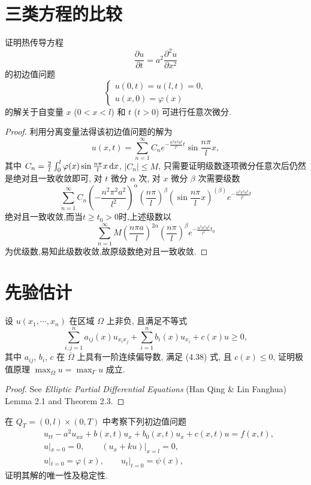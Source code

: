 \section{三类方程的比较}


\begin{exercise}
  证明热传导方程
  \[\frac{\partial u}{\partial t} = a^2 \frac{\partial^2 u}{\partial x^2}\]
  的初边值问题
  \[\begin{cases}
    u(0, t) = u(l, t) = 0, \\
    u(x, 0) = \varphi(x)
  \end{cases}\]
  的解关于自变量 $x$ ($0<x<l$) 和 $t$ ($t>0$) 可进行任意次微分.
\end{exercise}

\begin{proof}
  利用分离变量法得该初边值问题的解为
  \[u(x,t) = \sum_{n=1}^{\infty}C_ne^{-\frac{n^2\pi^2a^2}{l^2}t}\sin\frac{n\pi}{l}x,\]
  其中 $C_n=\frac{2}{l}\int_0^l\varphi(x)\sin\frac{n\pi}{l}x\mathop{}\!\mathrm{d} x$,
  $|C_n|\leq M$, 只需要证明级数逐项微分任意次后仍然是绝对且一致收敛即可,
  对 $t$ 微分 $\alpha$ 次, 对 $x$ 微分 $\beta$ 次需要级数
  \[\sum_{n=1}^{\infty}C_n\left(-\frac{n^2\pi^2a^2}{l^2}\right)^{\alpha}\left(\frac{n\pi}{l}\right)^{\beta}\left(\sin\frac{n\pi}{l}x\right)^{(\beta)}e^{-\frac{n^2\pi^2a^2}{l^2}t}\]
  绝对且一致收敛,而当$t\geq t_0>0$时,上述级数以
  \[\sum_{n=1}^{\infty}M\left(\frac{n\pi a}{l}\right)^{2\alpha}\left(\frac{n\pi}{l}\right)^{\beta}e^{-\frac{n^2\pi^2a^2}{l^2}t_0}\]
  为优级数,易知此级数收敛,故原级数绝对且一致收敛.
\end{proof}


\section{先验估计}

\begin{exercise}
  设 $u(x_1,\cdots,x_n)$ 在区域 $\Omega$ 上非负, 且满足不等式
  \[\sum_{i,j=1}^n a_{ij}(x) u_{x_ix_j} + \sum_{i=1}^n b_i(x) u_{x_i} + c(x)u\geq 0,\]
  其中 $a_{ij}$, $b_i$, $c$ 在 $\overline{\Omega}$ 上具有一阶连续偏导数,
  满足 (4.38) 式, 且 $c(x)\leq 0$,
  证明极值原理 $\max_{\overline{\Omega}}u=\max_{\Gamma}u$ 成立.
\end{exercise}

\begin{proof}
  See \emph{Elliptic Partial Differential Equations} (Han Qing \& Lin Fanghua) 
  Lemma 2.1 and Theorem 2.3.
\end{proof}


\begin{exercise}[3]
  在 $Q_T = (0,l)\times (0,T)$ 中考察下列初边值问题
  \begin{align*}
    & u_{tt} - a^2 u_{xx} + b(x,t)u_x + b_0(x,t)u_x + c(x,t)u = f(x,t), \\
    & u|_{x=0} = 0,\qquad (u_x + ku)|_{x=l} = 0, \\
    & u|_{t=0} = \varphi(x), \qquad u_t|_{t=0} = \psi(x),
  \end{align*}
  证明其解的唯一性及稳定性.
\end{exercise}

